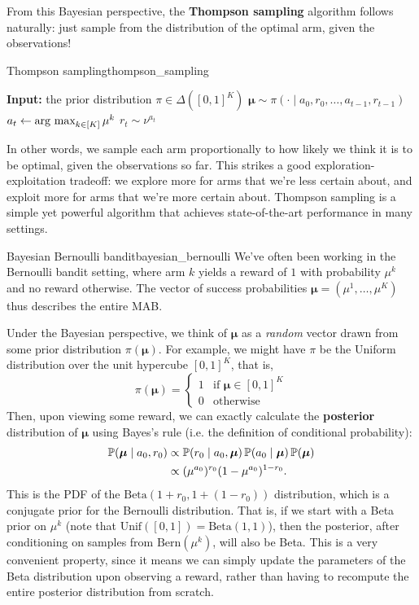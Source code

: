 \documentclass[\main/main]{subfiles}
\newcommand{\muv}{\boldsymbol{\mu}}
\begin{document}
From this Bayesian perspective, the \textbf{Thompson sampling} algorithm follows naturally: just sample from the distribution of the optimal arm, given the observations!
\begin{definition}{Thompson sampling}{thompson_sampling}
\begin{algorithmic}
\State \textbf{Input:} the prior distribution $\pi \in \Delta([0, 1]^K)$
    \State $\muv \sim \pi(\cdot \mid a_0, r_0, \dots, a_{t-1}, r_{t-1})$
    \State $a_t \gets \operatorname*{\textrm{arg\ max}}_{k \in [K]} \mu^k$
    \State $r_t \sim \nu^{a_t}$
\EndFor
\end{algorithmic}
\end{definition}
In other words, we sample each arm proportionally to how likely we think it is to be optimal, given the observations so far.
This strikes a good exploration-exploitation tradeoff: we explore more for arms that we're less certain about, and exploit more for arms that we're more certain about.
Thompson sampling is a simple yet powerful algorithm that achieves state-of-the-art performance in many settings.

\begin{example}{Bayesian Bernoulli bandit}{bayesian_bernoulli}
    We've often been working in the Bernoulli bandit setting, where arm $k$ yields a reward of $1$ with probability $\mu^k$ and no reward otherwise. The vector of success probabilities $\muv = (\mu^1, \dots, \mu^K)$ thus describes the entire MAB.
    
    Under the Bayesian perspective, we think of $\muv$ as a \emph{random} vector drawn from some prior distribution $\pi(\muv)$. For example, we might have $\pi$ be the Uniform distribution over the unit hypercube $[0, 1]^K$, that is, \[
        \pi(\muv) = \begin{cases}
            1 & \text{if } \muv \in [0, 1]^K \\
            0 & \text{otherwise}
        \end{cases}
    \]
    Then, upon viewing some reward, we can exactly calculate the \textbf{posterior} distribution of $\muv$ using Bayes's rule (i.e. the definition of conditional probability):
    \begin{align*}
        \P(\muv \mid a_0, r_0) &\propto \P(r_0 \mid a_0, \muv) \P(a_0 \mid \muv) \P(\muv) \\
        &\propto (\mu^{a_0})^{r_0} (1 - \mu^{a_0})^{1-r_0}.
    \end{align*}
    This is the PDF of the $\text{Beta}(1 + r_0, 1 + (1 - r_0))$ distribution, which is a conjugate prior for the Bernoulli distribution. That is, if we start with a Beta prior on $\mu^k$ (note that $\text{Unif}([0, 1]) = \text{Beta}(1, 1)$), then the posterior, after conditioning on samples from $\text{Bern}(\mu^k)$, will also be Beta. This is a very convenient property, since it means we can simply update the parameters of the Beta distribution upon observing a reward, rather than having to recompute the entire posterior distribution from scratch.
\end{example}
\end{document}
